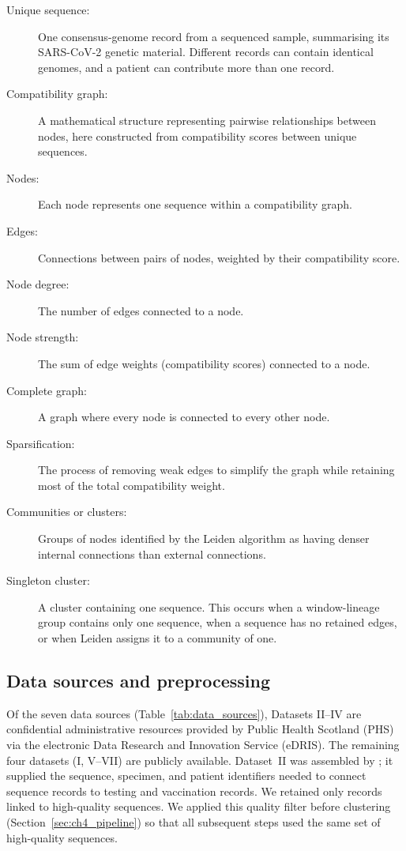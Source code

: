 \begin{tcolorbox}[
    title=\textbf{Glossary}: key terms in graph-based genomic surveillance used in this chapter, 
    halign=right, 
    fontupper=\small
    ]
\begin{description}
    \item[Unique sequence:] One consensus-genome record from a sequenced sample, summarising its SARS-CoV-2 genetic material. Different records can contain identical genomes, and a patient can contribute more than one record.
    \item[Compatibility graph:] A mathematical structure representing pairwise relationships between nodes, here constructed from compatibility scores between unique sequences.
    \item[Nodes:] Each node represents one sequence within a compatibility graph.
    \item[Edges:] Connections between pairs of nodes, weighted by their compatibility score.
    \item[Node degree:] The number of edges connected to a node.
    \item[Node strength:] The sum of edge weights (compatibility scores) connected to a node.
    \item[Complete graph:] A graph where every node is connected to every other node.
    \item[Sparsification:] The process of removing weak edges to simplify the graph while retaining most of the total compatibility weight.
    \item[Communities or clusters:] Groups of nodes identified by the Leiden algorithm as having denser internal connections than external connections.
    \item[Singleton cluster:] A cluster containing one sequence. This occurs when a window-lineage group contains only one sequence, when a sequence has no retained edges, or when Leiden assigns it to a community of one.
\end{description}
\end{tcolorbox}

\subsection{Data sources and preprocessing}\label{sec:ch4_data}

Of the seven data sources (Table~\ref{tab:data_sources}), Datasets II--IV are confidential administrative resources provided by Public Health Scotland (PHS) via the electronic Data Research and Innovation Service (eDRIS). The remaining four datasets (I, V--VII) are publicly available. Dataset~II was assembled by \citet{Gamza2024}; it supplied the sequence, specimen, and patient identifiers needed to connect sequence records to testing and vaccination records. We retained only records linked to high-quality sequences. We applied this quality filter before clustering (Section~\ref{sec:ch4_pipeline}) so that all subsequent steps used the same set of high-quality sequences.

